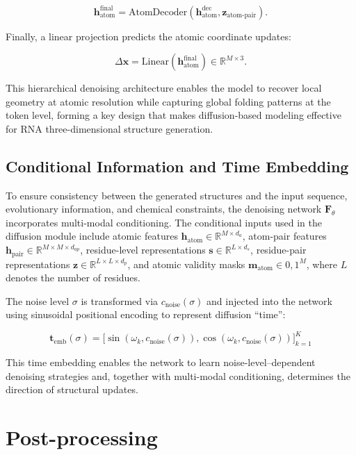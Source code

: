 $$  
\mathbf{h}_{\text{atom}}^{\text{final}} =  
\mathrm{AtomDecoder}\left(  
\mathbf{h}_{\text{atom}}^{\text{dec}}, \mathbf{z}_{\text{atom-pair}}  
\right).  
$$

Finally, a linear projection predicts the atomic coordinate updates:

$$  
\Delta \mathbf{x} =  
\mathrm{Linear}(\mathbf{h}_{\text{atom}}^{\text{final}})  
\in \mathbb{R}^{M \times 3}.  
$$

This hierarchical denoising architecture enables the model to recover local geometry at atomic resolution while capturing global folding patterns at the token level, forming a key design that makes diffusion-based modeling effective for RNA three-dimensional structure generation.


\subsection{Conditional Information and Time Embedding}

To ensure consistency between the generated structures and the input sequence, evolutionary information, and chemical constraints, the denoising network $\mathbf{F}_\theta$ incorporates multi-modal conditioning. The conditional inputs used in the diffusion module include atomic features $\mathbf{h}_{\mathrm{atom}} \in \mathbb{R}^{M \times d_a}$, atom-pair features $\mathbf{h}_{\mathrm{pair}} \in \mathbb{R}^{M \times M \times d_{ap}}$, residue-level representations $\mathbf{s} \in \mathbb{R}^{L \times d_s}$, residue-pair representations $\mathbf{z} \in \mathbb{R}^{L \times L \times d_p}$, and atomic validity masks $\mathbf{m}_{\mathrm{atom}} \in {0,1}^{M}$, where $L$ denotes the number of residues.

The noise level $\sigma$ is transformed via $c_{\mathrm{noise}}(\sigma)$ and injected into the network using sinusoidal positional encoding to represent diffusion “time”:

$$  
\mathbf{t}_{\mathrm{emb}}(\sigma)
=
\Big[  
\sin(\omega_k, c_{\mathrm{noise}}(\sigma)),  
\cos(\omega_k, c_{\mathrm{noise}}(\sigma))  
\Big]_{k=1}^{K}  
$$

This time embedding enables the network to learn noise-level–dependent denoising strategies and, together with multi-modal conditioning, determines the direction of structural updates.

\section{Post-processing}

